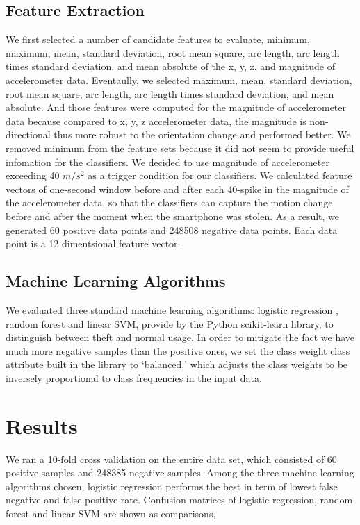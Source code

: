 \subsection{Feature Extraction}
We first selected a number of candidate features to evaluate, minimum, maximum, mean, standard deviation, root mean square, arc length, arc length times standard deviation, and mean absolute of the x, y, z, and magnitude of accelerometer data. Eventaully, we selected maximum, mean, standard deviation, root mean square, arc length, arc length times standard deviation, and mean absolute. And those features were computed for the magnitude of accelerometer data because compared to x, y, z accelerometer data, the magnitude is non-directional thus more robust to the orientation change and performed better. We removed minimum from the feature sets because it did not seem to provide useful infomation for the classifiers. We decided to use magnitude of accelerometer exceeding 40 $m/s^2$ as a trigger condition for our classifiers. We calculated feature vectors of one-second window before and after each 40-spike in the magnitude of the accelerometer data, so that the classifiers can capture the motion change before and after the moment when the smartphone was stolen. As a result, we generated 60 positive data points and 248508 negative data points. Each data point is a 12 dimentsional feature vector.


\subsection{Machine Learning Algorithms}
We evaluated three standard machine learning algorithms: logistic regression , random forest and linear SVM, provide by the Python scikit-learn library, to distinguish between theft and normal usage. In order to mitigate the fact we have much more negative samples than the positive ones, we set the class weight class attribute built in the library to `balanced,' which adjusts the class weights to be inversely proportional to class frequencies in the input data.


\section{Results}
We ran a 10-fold cross validation on the entire data set, which consisted of 60 positive samples and 248385 negative samples. Among the three machine learning algorithms chosen, logistic regression performs the best in term of lowest false negative and false positive rate. Confusion matrices of logistic regression, random forest and linear SVM are shown as comparisons, \\

